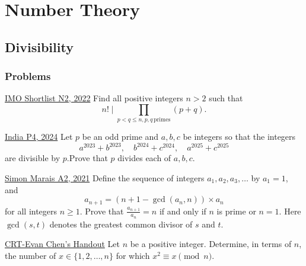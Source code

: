 \chapter{Number Theory}
\section{Divisibility}
\subsection{Problems}
\begin{problem}{1}{\href{https://artofproblemsolving.com/community/q2h3107356p34893836}{IMO Shortlist N2, 2022}}
	Find all positive integers $n>2$ such that
$$ n! \mid \prod_{ p<q\le n, p,q \, \text{primes}} (p+q).$$
\end{problem}

\begin{problem}{2}{\href{https://artofproblemsolving.com/community/c6h3239264p34615369}{India P4, 2024}}
	Let $p$ be an odd prime and $a,b,c$ be integers so that the integers$$a^{2023}+b^{2023},\quad b^{2024}+c^{2024},\quad a^{2025}+c^{2025}$$are divisible by $p$.Prove that $p$ divides each of $a,b,c$.
\end{problem}

\begin{problem}{3}{\href{https://artofproblemsolving.com/community/c7h2709003p34748857}{Simon Marais A2, 2021}}
	Define the sequence of integers $a_1, a_2, a_3, \ldots$ by $a_1 = 1$, and
\[ a_{n+1} = \left(n+1-\gcd(a_n,n) \right) \times a_n \]for all integers $n \ge 1$. Prove that $\frac{a_{n+1}}{a_n}=n$ if and only if $n$ is prime or $n=1$. Here $\gcd(s,t)$ denotes the greatest common divisor of $s$ and $t$.
\end{problem}

\begin{problem}{4}{\href{https://web.evanchen.cc/handouts/CRT/CRT.pdf}{CRT-Evan Chen's Handout}}
	Let $n$ be a positive integer. Determine, in terms of $n$, the number of $x\in\{1,2, \ldots, n\}$ for which $x^2\equiv x\pmod{n}$.
\end{problem}

\newpage
